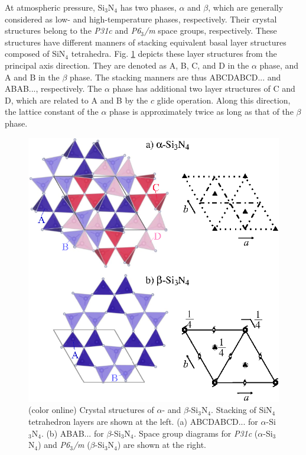 \documentclass[twocolumn,amsmath,amssymb,a4paper,prb,superscriptaddress,floatfix]{revtex4-1}
\begin{document}
At atmospheric pressure, Si$_3$N$_4$ has two phases, $\alpha$ and $\beta$, which
are generally considered as low- and high-temperature phases,
respectively.\cite{zhou,hirosaki-md,riley} Their crystal structures belong to
the {\it P31c} and {\it P6$_3$/m} space groups, respectively.\cite{yashima,boulay} These
structures have different manners of stacking equivalent basal layer structures
composed of SiN$_4$ tetrahedra.\cite{hampshire} Fig. \ref{fig:Fig1_cryst}
depicts these layer structures from the principal axis direction. They are
denoted as A, B, C, and D in the $\alpha$ phase, and A and B in the $\beta$
phase. The stacking manners are thus ABCDABCD... and ABAB..., respectively. The
$\alpha$ phase has additional two layer structures of C and D, which are related
to A and B by the $c$ glide operation.\cite{hampshire} Along this direction, the
lattice constant of the $\alpha$ phase is approximately twice as long as that of
the $\beta$ phase.
\begin{figure}[ht]
 \begin{center}
  \includegraphics[width=0.90\linewidth]{Fig1_crystal_str2.eps} \caption{(color
  online) Crystal structures of $\alpha$- and $\beta$-Si$_3$N$_4$. Stacking of
  SiN$_4$ tetrahedron layers are shown at the left. (a) ABCDABCD... for
  $\alpha$-Si$_3$N$_4$. (b) ABAB... for $\beta$-Si$_3$N$_4$.  Space group
  diagrams\cite{inttableA} for {\it P31c} ($\alpha$-Si$_3$N$_4$) and {\it
  P6$_3$/m} ($\beta$-Si$_3$N$_4$)
  are shown at the right.}
  \label{fig:Fig1_cryst} 
 \end{center}
\end{figure}
\end{document}
